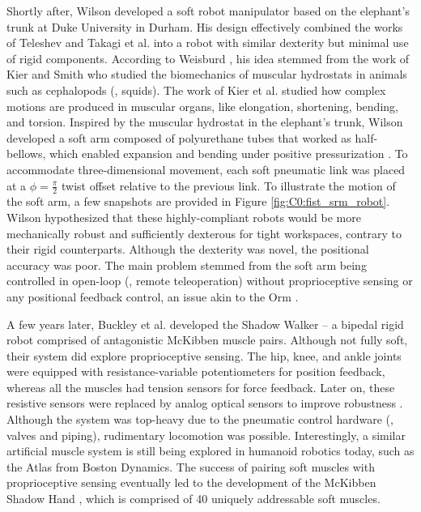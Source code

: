 \par Shortly after, Wilson \cite{Wilson2007} developed a soft robot manipulator based on the elephant's trunk at Duke University in Durham. His design effectively combined the works of Teleshev \cite{Teleshev1981} and Takagi et al. \cite{Takagi1983} into a robot with similar dexterity but minimal use of rigid components. According to Weisburd \cite{Weisburd1988}, his idea stemmed from the work of Kier and Smith \cite{Kier1985} who studied the biomechanics of muscular hydrostats in animals such as cephalopods (\eg, squids). The work of Kier et al. \cite{Kier1985} studied how complex motions are produced in muscular organs, like elongation, shortening, bending, and torsion. Inspired by the muscular hydrostat in the elephant's trunk, Wilson developed a soft arm composed of polyurethane tubes that worked as half-bellows, which enabled expansion and bending under positive pressurization \cite{Weisburd1988}. To accommodate three-dimensional movement, each soft pneumatic link was placed at a $\phi = \frac{\pi}{2}$ twist offset relative to the previous link. To illustrate the motion of the soft arm, a few snapshots are provided in Figure \ref{fig:C0:fist_srm_robot}. Wilson hypothesized that these highly-compliant robots would be more mechanically robust and sufficiently dexterous for tight workspaces, contrary to their rigid counterparts. Although the dexterity was novel, the positional accuracy was poor. The main problem stemmed from the soft arm being controlled in open-loop (\ie, remote teleoperation) without proprioceptive sensing or any positional feedback control, an issue akin to the Orm \cite{Corke2020}.

A few years later, Buckley et al. \cite{Buckley2012} developed the Shadow Walker -- a bipedal rigid robot comprised of antagonistic McKibben muscle pairs. Although not fully soft, their system did explore proprioceptive sensing. The hip, knee, and ankle joints were equipped with resistance-variable potentiometers for position feedback, whereas all the muscles had tension sensors for force feedback. Later on, these resistive sensors were replaced by analog optical sensors to improve robustness \cite{Buckley2012}. Although the system was top-heavy due to the pneumatic control hardware (\eg, valves and piping), rudimentary locomotion was possible. Interestingly, a similar artificial muscle system is still being explored in humanoid robotics today, such as the Atlas from Boston Dynamics. The success of pairing soft muscles with proprioceptive sensing eventually led to the development of the McKibben Shadow Hand \cite{Buckley2012,Gong2022Feb}, which is comprised of 40 uniquely addressable soft muscles.

